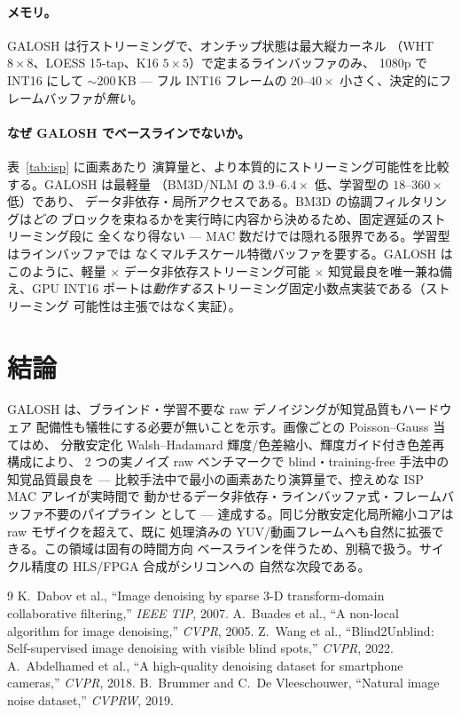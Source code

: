 \documentclass[twocolumn,10pt]{ltjsarticle}
\begin{document}
\paragraph{メモリ。}GALOSH は行ストリーミングで、オンチップ状態は最大縦カーネル
（WHT $8{\times}8$、LOESS 15-tap、K16 $5{\times}5$）で定まるラインバッファのみ、
1080p で INT16 にして $\sim\!200$\,KB --- フル INT16 フレームの $20$--$40\times$
小さく、決定的にフレームバッファが\emph{無い}。

\paragraph{なぜ GALOSH でベースラインでないか。}表~\ref{tab:isp} に画素あたり
演算量と、より本質的にストリーミング可能性を比較する。GALOSH は最軽量
（BM3D/NLM の $3.9$--$6.4\times$ 低、学習型の $18$--$360\times$ 低）であり、
データ非依存・局所アクセスである。BM3D の協調フィルタリングは\emph{どの}
ブロックを束ねるかを実行時に内容から決めるため、固定遅延のストリーミング段に
全くなり得ない --- MAC 数だけでは隠れる限界である。学習型はラインバッファでは
なくマルチスケール特徴バッファを要する。GALOSH はこのように、軽量 $\times$
データ非依存ストリーミング可能 $\times$ 知覚最良を唯一兼ね備え、GPU INT16
ポートは\emph{動作する}ストリーミング固定小数点実装である（ストリーミング
可能性は主張ではなく実証）。



\section{結論}
GALOSH は、ブラインド・学習不要な raw デノイジングが知覚品質もハードウェア
配備性も犠牲にする必要が無いことを示す。画像ごとの Poisson--Gauss 当てはめ、
分散安定化 Walsh--Hadamard 輝度/色差縮小、輝度ガイド付き色差再構成により、
2 つの実ノイズ raw ベンチマークで blind・training-free 手法中の知覚品質最良を
--- 比較手法中で最小の画素あたり演算量で、控えめな ISP MAC アレイが実時間で
動かせるデータ非依存・ラインバッファ式・フレームバッファ不要のパイプライン
として --- 達成する。同じ分散安定化局所縮小コアは raw モザイクを超えて、既に
処理済みの YUV/動画フレームへも自然に拡張できる。この領域は固有の時間方向
ベースラインを伴うため、別稿で扱う。サイクル精度の HLS/FPGA 合成がシリコンへの
自然な次段である。

\begin{thebibliography}{9}\small
{} K.\ Dabov et al., ``Image denoising by sparse 3-D transform-domain
collaborative filtering,'' \emph{IEEE TIP}, 2007.
 A.\ Buades et al., ``A non-local algorithm for image denoising,''
\emph{CVPR}, 2005.
 Z.\ Wang et al., ``Blind2Unblind: Self-supervised image denoising
with visible blind spots,'' \emph{CVPR}, 2022.
 A.\ Abdelhamed et al., ``A high-quality denoising dataset for
smartphone cameras,'' \emph{CVPR}, 2018.
 B.\ Brummer and C.\ De Vleeschouwer, ``Natural image noise
dataset,'' \emph{CVPRW}, 2019.
\end{thebibliography}
\end{document}
